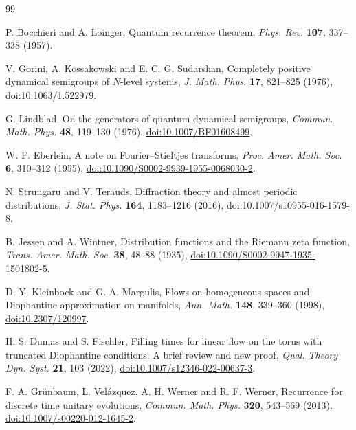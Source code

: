 \begin{thebibliography}{99}

P. Bocchieri and A. Loinger,
Quantum recurrence theorem,
\emph{Phys. Rev.} \textbf{107}, 337--338 (1957).

V. Gorini, A. Kossakowski and E. C. G. Sudarshan,
Completely positive dynamical semigroups of $N$-level systems,
\emph{J. Math. Phys.} \textbf{17}, 821--825 (1976),
\href{https://doi.org/10.1063/1.522979}{doi:10.1063/1.522979}.

G. Lindblad,
On the generators of quantum dynamical semigroups,
\emph{Commun. Math. Phys.} \textbf{48}, 119--130 (1976),
\href{https://doi.org/10.1007/BF01608499}{doi:10.1007/BF01608499}.

W. F. Eberlein,
A note on Fourier--Stieltjes transforms,
\emph{Proc. Amer. Math. Soc.} \textbf{6}, 310--312 (1955),
\href{https://doi.org/10.1090/S0002-9939-1955-0068030-2}%
{doi:10.1090/S0002-9939-1955-0068030-2}.

N. Strungaru and V. Terauds,
Diffraction theory and almost periodic distributions,
\emph{J. Stat. Phys.} \textbf{164}, 1183--1216 (2016),
\href{https://doi.org/10.1007/s10955-016-1579-8}%
{doi:10.1007/s10955-016-1579-8}.

B. Jessen and A. Wintner,
Distribution functions and the Riemann zeta function,
\emph{Trans. Amer. Math. Soc.} \textbf{38}, 48--88 (1935),
\href{https://doi.org/10.1090/S0002-9947-1935-1501802-5}%
{doi:10.1090/S0002-9947-1935-1501802-5}.

D. Y. Kleinbock and G. A. Margulis,
Flows on homogeneous spaces and Diophantine approximation on manifolds,
\emph{Ann. Math.} \textbf{148}, 339--360 (1998),
\href{https://doi.org/10.2307/120997}{doi:10.2307/120997}.

H. S. Dumas and S. Fischler,
Filling times for linear flow on the torus with truncated Diophantine
conditions: A brief review and new proof,
\emph{Qual. Theory Dyn. Syst.} \textbf{21}, 103 (2022),
\href{https://doi.org/10.1007/s12346-022-00637-3}%
{doi:10.1007/s12346-022-00637-3}.

F. A. Gr\"unbaum, L. Vel\'azquez, A. H. Werner and R. F. Werner,
Recurrence for discrete time unitary evolutions,
\emph{Commun. Math. Phys.} \textbf{320}, 543--569 (2013),
\href{https://doi.org/10.1007/s00220-012-1645-2}%
{doi:10.1007/s00220-012-1645-2}.


\end{thebibliography}
